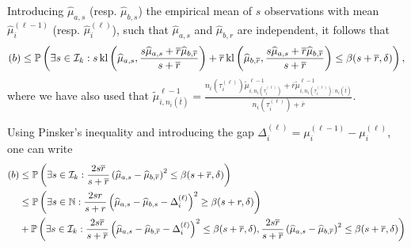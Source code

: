 Introducing $\widehat{\mu}_{a,s}$ (resp. $\widehat{\mu}_{b,s}$) the empirical mean of $s$ \iid{} observations with mean $\widehat{\mu}_i^{(\ell-1)}$ (resp. $\widehat{\mu}_i^{(\ell)}$), such that $\widehat{\mu}_{a,s}$ and $\widehat{\mu}_{b,r}$ are independent, it follows that
\[
    (b)  \leq \mathbb{P}\left(\exists s \in \mathcal{I}_k : s \, \mathrm{kl}\left(\widehat{\mu}_{a,s},\frac{s\widehat{\mu}_{a,s}+\overline{r}\widehat{\mu}_{b,\overline{r}}}{s+\overline{r}} \right) +  \overline{r} \, \mathrm{kl}\left(\widehat{\mu}_{b,\overline{r}},\frac{s\widehat{\mu}_{a,s}+\overline{r}\widehat{\mu}_{b,\overline{r}}}{s+\overline{r}}  \right)  \leq \beta(s+\overline{r},\delta)\right),
\]
where we have also used that $\tilde{\mu}^{\ell-1}_{i,n_i(\overline{t})} = \frac{n_i(\tau_i^{(\ell)})\tilde{\mu}^{\ell-1}_{i,n_i(\tau_i^{(\ell)})} + \overline{r}\tilde{\mu}^{\ell-1}_{i,n_i(\tau_i^{(\ell)}) : n_i(\overline{t})}}{n_i(\tau_i^{(\ell)}) + \overline{r}}$.

Using Pinsker's inequality and introducing the gap $\Delta_i^{(\ell)} = \mu_i^{(\ell-1)} - {\mu}_i^{(\ell)}$, one can write
\begin{align}
    (b) & \leq \mathbb{P}\left(\exists s \in \mathcal{I}_k : \frac{2s\overline{r}}{s+\overline{r}}\left(\widehat{\mu}_{a,s} - \widehat{\mu}_{b,\overline{r}} \right)^2  \leq \beta(s+\overline{r},\delta)\right)\nonumber\\
    & \leq \mathbb{P}\left(\exists s \in \mathbb{N} : \frac{2sr}{s+r}\left(\widehat{\mu}_{a,s} - \widehat{\mu}_{b,s} - \Delta_i^{(\ell)}\right)^2  \geq \beta(s+r,\delta)\right) \nonumber\\
    & + \mathbb{P}\left(\exists s \in \mathcal{I}_k : \frac{2s\overline{r}}{s+\overline{r}}\left(\widehat{\mu}_{a,s} - \widehat{\mu}_{b,\overline{r}} - \Delta_i^{(\ell)}\right)^2  \leq \beta(s+\overline{r},\delta), \frac{2s\overline{r}}{s+\overline{r}}\left(\widehat{\mu}_{a,s} - \widehat{\mu}_{b,\overline{r}}\right)^2  \leq \beta(s+\overline{r},\delta)\right) \nonumber
\end{align}
%

